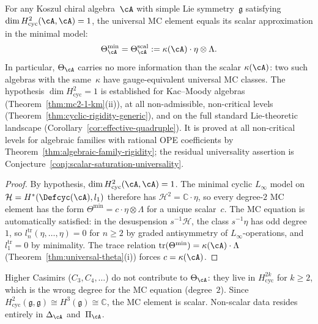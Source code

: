 \begin{corollary}
\label{cor:scalar-saturation}
For any Koszul chiral algebra~$\cA$ with simple Lie
symmetry~$\mathfrak{g}$ satisfying
$\dim H^2_{\mathrm{cyc}}(\cA,\cA) = 1$, the universal MC element
equals its scalar approximation in the minimal model:
\[
\Theta_{\cA}^{\min} = \Theta_{\cA}^{\mathrm{scal}}
:= \kappa(\cA) \cdot \eta \otimes \Lambda.
\]
In particular, $\Theta_{\cA}$ carries no more information than the
scalar $\kappa(\cA)$: two such algebras with the same~$\kappa$
have gauge-equivalent universal MC classes.
The hypothesis $\dim H^2_{\mathrm{cyc}} = 1$ is established
for Kac--Moody algebras
\textup{(}Theorem~\textup{\ref{thm:mc2-1-km}}\textup{(ii)}\textup{)},
at all non-admissible, non-critical levels
\textup{(}Theorem~\textup{\ref{thm:cyclic-rigidity-generic}}\textup{)},
and on the full standard Lie-theoretic landscape
\textup{(}Corollary~\textup{\ref{cor:effective-quadruple}}\textup{)}.
It is proved at all non-critical levels for
algebraic families with rational OPE coefficients by
Theorem~\textup{\ref{thm:algebraic-family-rigidity}};
the residual universality assertion is
Conjecture~\textup{\ref{conj:scalar-saturation-universality}}.
\end{corollary}

\begin{proof}
By hypothesis, $\dim H^2_{\mathrm{cyc}}(\cA,\cA) = 1$.
The minimal cyclic $L_\infty$ model on
$\mathcal{H} = H^*(\Defcyc(\cA), l_1)$ therefore has
$\mathcal{H}^2 = \mathbb{C}\!\cdot\!\eta$, so every degree-$2$
MC element has the form
$\Theta^{\min} = c \cdot \eta \otimes \Lambda$ for a unique
scalar~$c$.
The MC equation is automatically satisfied: in the desuspension
$s^{-1}\mathcal{H}$, the class $s^{-1}\eta$ has odd degree~$1$,
so $l_n^{\mathrm{tr}}(\eta,\ldots,\eta) = 0$ for $n \geq 2$ by
graded antisymmetry of $L_\infty$-operations, and
$l_1^{\mathrm{tr}} = 0$ by minimality.
The trace relation
$\operatorname{tr}(\Theta^{\min}) = \kappa(\cA) \cdot \Lambda$
(Theorem~\ref{thm:universal-theta}(i)) forces $c = \kappa(\cA)$.
\end{proof}

\begin{remark}
\label{rem:scalar-saturation-casimirs}
Higher Casimirs ($C_3, C_4, \ldots$) do not contribute to
$\Theta_{\cA}$: they live in $H^{2k}_{\mathrm{cyc}}$ for
$k\geq 2$, which is the wrong degree for the MC equation (degree~$2$).
Since $H^2_{\mathrm{cyc}}(\mathfrak{g},\mathfrak{g})\cong
H^3(\mathfrak{g})\cong\mathbb{C}$, the MC element is scalar.
Non-scalar data resides entirely in $\Delta_{\cA}$ and~$\Pi_{\cA}$.
\end{remark}

